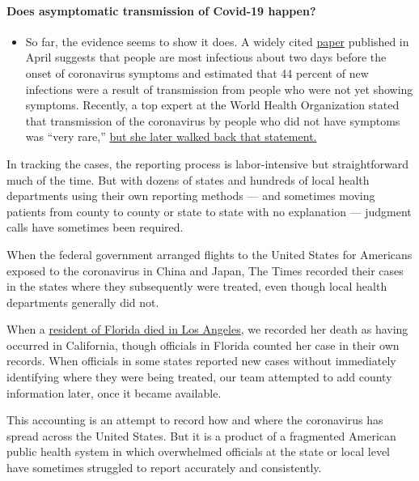 \begin{itemize}
{  \paragraph{Does asymptomatic transmission of Covid-19
  happen?}\label{does-asymptomatic-transmission-of-covid-19-happen}}

  \begin{itemize}
  \tightlist
  \item
    So far, the evidence seems to show it does. A widely cited
    \href{https://www.nature.com/articles/s41591-020-0869-5}{paper}
    published in April suggests that people are most infectious about
    two days before the onset of coronavirus symptoms and estimated that
    44 percent of new infections were a result of transmission from
    people who were not yet showing symptoms. Recently, a top expert at
    the World Health Organization stated that transmission of the
    coronavirus by people who did not have symptoms was ``very rare,''
    \href{https://www.nytimes.com/2020/06/09/world/coronavirus-updates.html?action=click\&pgtype=Article\&state=default\&region=MAIN_CONTENT_3\&context=storylines_faq\#link-1f302e21}{but
    she later walked back that statement.}
  \end{itemize}
\end{itemize}

In tracking the cases, the reporting process is labor-intensive but
straightforward much of the time. But with dozens of states and hundreds
of local health departments using their own reporting methods --- and
sometimes moving patients from county to county or state to state with
no explanation --- judgment calls have sometimes been required.

When the federal government arranged flights to the United States for
Americans exposed to the coronavirus in China and Japan, The Times
recorded their cases in the states where they subsequently were treated,
even though local health departments generally did not.

When a
\href{https://www.nytimes.com/2020/03/22/us/coronavirus-deaths-united-states.html}{resident
of Florida died in Los Angeles}, we recorded her death as having
occurred in California, though officials in Florida counted her case in
their own records. When officials in some states reported new cases
without immediately identifying where they were being treated, our team
attempted to add county information later, once it became available.

This accounting is an attempt to record how and where the coronavirus
has spread across the United States. But it is a product of a fragmented
American public health system in which overwhelmed officials at the
state or local level have sometimes struggled to report accurately and
consistently.

